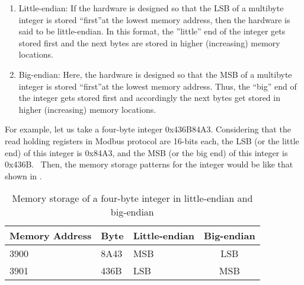 \begin{enumerate}
  \item Little-endian:
        If the hardware is designed so that the LSB of a multibyte integer is stored ``first''at the lowest memory address, then the hardware is said to be little-endian. In this format, the ''little'' end of the integer gets stored
        first and the next bytes are stored in higher (increasing) memory
        locations.
  \item Big-endian:
        Here, the hardware is designed so that the MSB of a multibyte integer is stored ``first''at the lowest memory address. Thus, the ``big'' end of the integer gets
        stored first and accordingly the next bytes get stored in higher
        (increasing) memory locations.
\end{enumerate}
For example, let us take a four-byte integer 0x436B84A3. Considering
that the read holding registers in Modbus protocol are 16-bits each, the
LSB (or the little end) of this integer is 0x84A3, and the MSB (or the big end)
of this integer is 0x436B.  Then, the memory storage patterns
for the integer would be like that shown in .
\begin{table}
  \centering
  \caption{Memory storage of a four-byte integer in little-endian and big-endian}
  \label{tab:memory-storage}
  \begin{tabular}{lllc}\hline
    Memory Address & Byte & Little-endian & Big-endian \\ \hline
    3900           & 8A43 & MSB           & LSB        \\
    3901           & 436B & LSB           & MSB        \\
    \hline
  \end{tabular}
\end{table}




